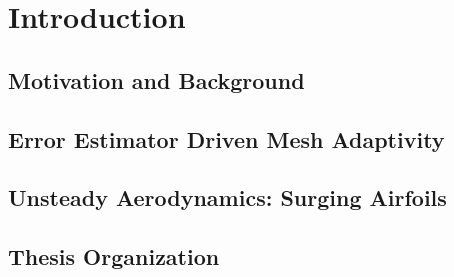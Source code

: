  
\chapter{Introduction}

\section{Motivation and Background}
\label{sec:motivation}




\section{Error Estimator Driven Mesh Adaptivity}
\label{sec:intro_ee}



\section{Unsteady Aerodynamics: Surging Airfoils}
\label{sec:surging}



\section{Thesis Organization}
\label{sec:thesis_organization}


